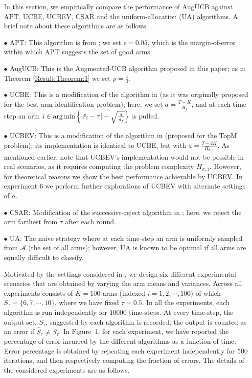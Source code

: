 
In this section, we empirically compare the  performance of AugUCB against APT, UCBE, UCBEV, CSAR and the uniform-allocation (UA) algorithms. A brief note about these algorithms are as follows:

$\bullet$ APT: This algorithm is from \cite{locatelli2016optimal}; we set $\epsilon=0.05$, which is the margin-of-error within which APT suggests the set of good arms.

$\bullet$ AugUCB: This is the Augmented-UCB algorithm proposed in this paper; as in Theorem \ref{Result:Theorem:1} we set $\rho=\frac{1}{3}$.

$\bullet$ UCBE: This is a modification of the algorithm in \cite{audibert2009exploration} (as it was originally proposed for the best arm identification problem); here, we set $a=\frac{T-K}{H_1}$, and at each time-step an arm $i\in\operatorname*{arg\,min}\left\lbrace |\hat{r}_{i} -\tau|-\sqrt{\frac{a}{n_{i}}} \right\rbrace$ is pulled.

$\bullet$ UCBEV: This is a modification of the algorithm in \cite{gabillon2011multi} (proposed for the TopM problem); its implementation is identical to UCBE, but with $a = \frac{T-2K}{H_{\sigma,1}}$. As mentioned earlier, note that UCBEV's implementation would not be possible in real scenarios, as it requires computing the problem complexity $H_{\sigma,1}$. However, for theoretical reasons we show the best performance achievable by UCBEV. In experiment 6 we perform further explorations of UCBEV with alternate settings of $a$.

$\bullet$ CSAR:  Modification of the successive-reject algorithm in \cite{chen2014combinatorial}; here, we reject the arm farthest from $\tau$ after each round. 

$\bullet$ UA: The naive strategy where at each time-step an arm is uniformly sampled from $\mathcal{A}$ (the set of all arms); however, UA is known to be optimal if all arms are equally difficult to classify. 


\noindent
Motivated by the settings considered in \cite{locatelli2016optimal}, 
we design six different experimental scenarios that are obtained by varying the arm means and variances.  Across all experiments consists of $K=100$  arms (indexed $i=1,2,\cdots,100$) of which ${S}_\tau=\{6,7,\cdots,10\}$, where we have fixed $\tau=0.5$. In all the experiments, each algorithm is run independently for $10000$ time-steps. At every time-step, the output set,  $\hat{S}_\tau$, suggested by each algorithm is recorded; the output is counted as an error if $\hat{S}_\tau\ne S_\tau$. In Figure~1, for each experiment, we have reported the percentage of error incurred by the different algorithms as a function of time; Error percentage is obtained by repeating each experiment independently  for $500$ iterations, and then respectively computing the fraction of errors. The details of the considered experiments are as follows.

